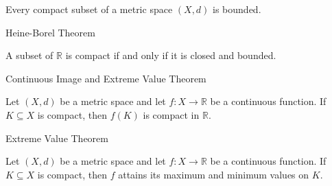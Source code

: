 \documentclass[12pt, a4paper]{article}
\begin{document}
\clearpage

\begin{theorem}
    Every compact subset of a metric space $(X, d)$ is bounded.
\end{theorem}

\clearpage

\begin{heading}
    Heine-Borel Theorem
\end{heading}

\vspace{10pt}

\begin{theorem}
    A subset of $\mathbb{R}$ is compact if and only if it is closed and bounded.
\end{theorem}

\clearpage

\begin{heading}
    Continuous Image and Extreme Value Theorem
\end{heading}

\begin{theorem}
    Let $(X, d)$ be a metric space and let $f : X \to \mathbb{R}$ be a continuous function. If $K \subseteq X$ is compact, then $f(K)$ is compact in $\mathbb{R}$.
\end{theorem}

\clearpage

\begin{heading}
    Extreme Value Theorem
\end{heading}

\vspace{10pt}

\begin{theorem}
    Let $(X, d)$ be a metric space and let $f : X \to \mathbb{R}$ be a continuous function. If $K \subseteq X$ is compact, then $f$ attains its maximum and minimum values on $K$.
\end{theorem}


\EndPage
\end{document}
